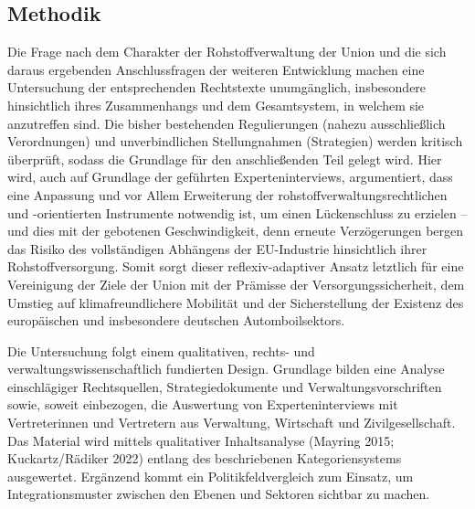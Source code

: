 \documentclass[12pt,a4paper,oneside]{book} %
\begin{document}
\subsection{Methodik}
Die Frage nach dem Charakter der Rohstoffverwaltung der Union und die sich daraus ergebenden Anschlussfragen der weiteren Entwicklung machen eine Untersuchung der entsprechenden Rechtstexte unumgänglich, insbesondere hinsichtlich ihres Zusammenhangs und dem Gesamtsystem, in welchem sie anzutreffen sind. Die bisher bestehenden Regulierungen (nahezu ausschließlich Verordnungen) und unverbindlichen Stellungnahmen (Strategien) werden kritisch überprüft, sodass die Grundlage für den anschließenden Teil gelegt wird. Hier wird, auch auf Grundlage der geführten Experteninterviews, argumentiert, dass eine Anpassung und vor Allem Erweiterung der rohstoffverwaltungsrechtlichen und -orientierten Instrumente notwendig ist, um einen Lückenschluss zu erzielen -- und dies mit der gebotenen Geschwindigkeit, denn erneute Verzögerungen bergen das Risiko des vollständigen Abhängens der EU-Industrie hinsichtlich ihrer Rohstoffversorgung. Somit sorgt dieser reflexiv-adaptiver Ansatz letztlich für eine Vereinigung der Ziele der Union mit der Prämisse der Versorgungssicherheit, dem Umstieg auf klimafreundlichere Mobilität und der Sicherstellung der Existenz des europäischen und insbesondere deutschen Automboilsektors.

Die Untersuchung folgt einem qualitativen, rechts- und verwaltungswissenschaftlich fundierten Design. Grundlage bilden eine Analyse einschlägiger Rechtsquellen, Strategiedokumente und Verwaltungsvorschriften sowie, soweit einbezogen, die Auswertung von Experteninterviews mit Vertreterinnen und Vertretern aus Verwaltung, Wirtschaft und Zivilgesellschaft. Das Material wird mittels qualitativer Inhaltsanalyse (Mayring 2015; Kuckartz/Rädiker 2022) entlang des beschriebenen Kategoriensystems ausgewertet. Ergänzend kommt ein Politikfeldvergleich zum Einsatz, um Integrationsmuster zwischen den Ebenen und Sektoren sichtbar zu machen.
\end{document}
